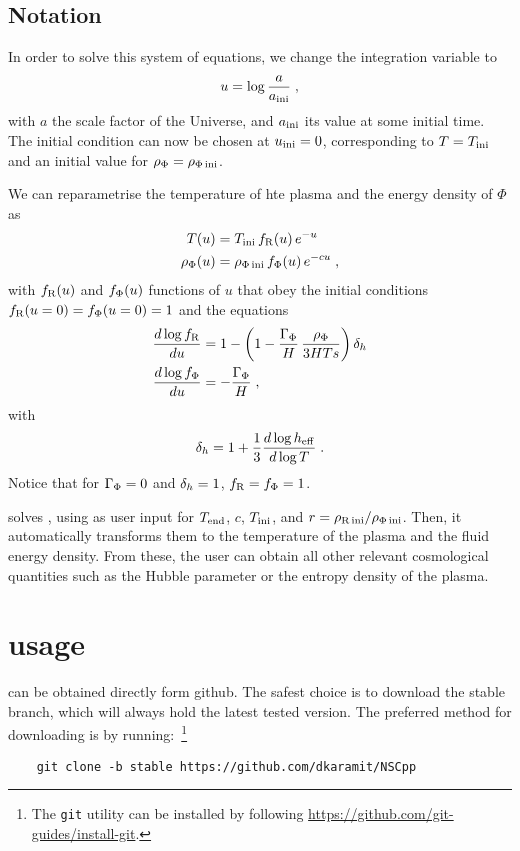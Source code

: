 \documentclass[11pt,a4paper]{article}
\begin{document}
\subsection{Notation}\label{sec:notation}

In order to solve this system of equations, we change the integration variable to 
%
\begin{equation}
	u=\log\frac{a}{a_{\rm ini}{}}\;,	
	\label{eq:u_def}
\end{equation}
%
with $a$ the scale factor of the Universe, and $a_{\rm ini}{}$ its value at some initial time. The initial condition can now be chosen at $u_{\rm ini}{}=0$, corresponding to $T=T_{\rm ini}{}$ and an initial value for $\rho_{\Phi}=\rho_{\Phi\,{\rm ini}}$. 

We can reparametrise the temperature of hte plasma and the energy density of $\Phi$ as 
%
\begin{align}
	T(u) &= T_{\rm ini}{}  \, f_{\rm R}(u) \, e^{-u}  \label{eq:fR_def} \\ 
	\rho_{\Phi}(u) &= \rho_{\Phi\,{\rm ini}} \, f_{\Phi}(u) \label{eq:fPhi_def} \, e^{-cu}\;,
\end{align}
%
with $f_{\rm R}(u)$ and $f_{\Phi}(u)$ functions of $u$ that obey the initial conditions $f_{\rm R}(u=0)=f_{\Phi}(u=0)=1$ and the equations
%
\begin{align}
	\dfrac{d\log f_{\rm R} }{du} &=  1- \left( 1- \dfrac{\Gamma_{\Phi}}{H} \, \dfrac{\rho_{\Phi}}{3HTs}   \right) \delta_h{}  \label{eq:dlogfRdu} \\ 
	\dfrac{d\log f_{\Phi}}{du} &= -\dfrac{\Gamma_{\Phi}}{H} \label{eq:dlogfPhidu} \;,
\end{align}
%
with 
\begin{equation}
	\delta_h{} = 1+ \dfrac{1}{3} \dfrac{d\log h_{\rm eff}{}}{d\log T}\;.
	\label{eq:dh_def}
\end{equation}
%
Notice that for $\Gamma_{\Phi}=0$ and $\delta_h{}=1$, $f_{\rm R}=f_{\Phi}=1$. 


\nsc solves , using as user input for $T_{\rm end}{}$, $c$, $T_{\rm ini}{}$, and $r=\rho_{\rm R\,ini}/\rho_{\Phi\,{\rm ini}}$. Then, it automatically transforms them to the temperature of the plasma and the fluid energy density. From these, the user can obtain all other relevant cosmological quantities such as the Hubble parameter or the entropy density of the plasma.

\section{\nsc usage}\label{sec:first_steps}
\setcounter{equation}{0}
%
\nsc can be obtained directly form github. The safest choice is to download the stable branch, which will always hold the latest tested version. The preferred method for downloading \nsc is by running:~\footnote{The {\tt git} utility can be installed by following \href{https://github.com/git-guides/install-git}{https://github.com/git-guides/install-git}.}
%
\begin{lstlisting}
	git clone -b stable https://github.com/dkaramit/NSCpp
\end{lstlisting}
\end{document}
